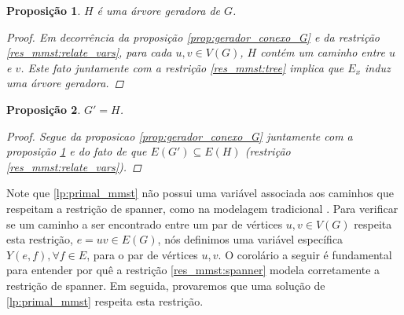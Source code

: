 \documentclass[11pt,reqno]{amsart}
\newtheorem{proposicao}{Proposição}
\begin{document}
\begin{proposicao}
\label{prop:x_arvore}
$H$ é uma árvore geradora de $G$.
\begin{proof}
Em decorrência da proposição \ref{prop:gerador_conexo_G} e da restrição 
\ref{res_mmst:relate_vars}, para cada $u,v \in V(G)$, $H$ contém um caminho 
entre $u$ e $v$. Este fato juntamente com a restrição \ref{res_mmst:tree} 
implica que $E_{x}$ induz uma árvore geradora.
\end{proof}
\end{proposicao}

\begin{proposicao}
\label{prop:GY_arvore}
$G' = H$.%
\begin{proof}
Segue da proposicao \ref{prop:gerador_conexo_G} juntamente com a proposição 
\ref{prop:x_arvore} e do fato de que $E(G') \subseteq E(H)$ (restrição 
\ref{res_mmst:relate_vars}).
\end{proof}
\end{proposicao}

Note que \ref{lp:primal_mmst} não possui uma variável associada aos 
caminhos que respeitam a restrição de spanner, como na modelagem tradicional 
\cite{SigurdZ2004,DinitzK2011}. 
Para verificar se um caminho 
a ser encontrado entre um par de vértices $u,v \in V(G)$ 
respeita esta restrição, $e=uv \in E(G)$, 
nós definimos uma variável específica $Y(e,f), \forall f \in E$, para o par 
de vértices $u,v$. 
O corolário a seguir é fundamental para entender por quê a restrição 
\ref{res_mmst:spanner} modela corretamente a restrição de spanner. Em seguida, 
provaremos que uma solução de \ref{lp:primal_mmst} 
respeita esta restrição.
\end{document}
